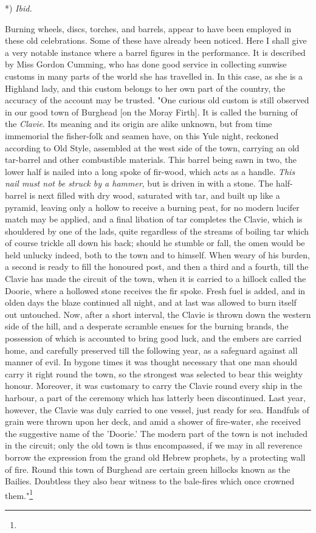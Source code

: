 \documentclass[a4paper, 11pt, oneside, polutonikogreek, english]{article}
\begin{document}
*) \emph{Ibid.}

Burning wheels, discs, torches, and barrels, appear to have been employed in these old celebrations. Some of these have already been noticed. Here I shall give a very notable instance where a barrel figures in the performance. It is described by Miss Gordon Cumming, who has done good service in collecting sunwise customs in many parts of the world she has travelled in. In this case, as she is a Highland lady, and this custom belongs to her own part of the country, the accuracy of the account may be trusted. "One curious old custom is still observed in our good town of Burghead [on the Moray Firth]. It is called the burning of the \emph{Clavie}. Its meaning and its origin are alike unknown, but from time immemorial the fisher-folk and seamen have, on this Yule night, reckoned according to Old Style, assembled at the west side of the town, carrying an old tar-barrel and other combustible materials. This barrel being sawn in two, the lower half is nailed into a long spoke of fir-wood, which acts as a handle. \emph{This nail must not be struck by a hammer}, but is driven in with a stone. The half-barrel is next filled with dry wood, saturated with tar, and built up like a pyramid, leaving only a hollow to receive a burning peat, for no modern lucifer match may be applied, and a final libation of tar completes the Clavie, which is shouldered by one of the lads, quite regardless of the streams of boiling tar which of course trickle all down his back; should he stumble or fall, the omen would be held unlucky indeed, both to the town and to himself. When weary of his burden, a second is ready to fill the honoured post, and then a third and a fourth, till the Clavie has made the circuit of the town, when it is carried to a hillock called the Doorie, where a hollowed stone receives the fir spoke. Fresh fuel is added, and in olden days the blaze continued all night, and at last was allowed to burn itself out untouched. Now, after a short interval, the Clavie is thrown down the western side of the hill, and a desperate scramble ensues for the burning brands, the possession of which is accounted to bring good luck, and the embers are carried home, and carefully preserved till the following year, as a safeguard against all manner of evil. In bygone times it was thought necessary that one man should carry it right round the town, so the strongest was selected to bear this weighty honour. Moreover, it was customary to carry the Clavie round every ship in the harbour, a part of the ceremony which has latterly been discontinued. Last year, however, the Clavie was duly carried to one vessel, just ready for sea. Handfuls of grain were thrown upon her deck, and amid a shower of fire-water, she received the suggestive name of the 'Doorie.' The modern part of the town is not included in the circuit; only the old town is thus encompassed, if we may in all reverence borrow the expression from the grand old Hebrew prophets, by a protecting wall of fire. Round this town of Burghead are certain green hillocks known as the Bailies. Doubtless they also bear witness to the bale-fires which once crowned them."\footnote{}
\end{document}
